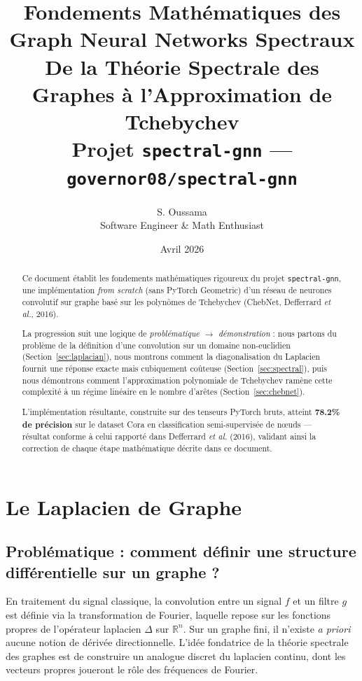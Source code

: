 \documentclass[12pt, a4paper]{article}
\title{%
  \vspace{-1cm}
  {\LARGE\bfseries Fondements Mathématiques des Graph Neural Networks Spectraux}\\[0.8em]
  {\large De la Théorie Spectrale des Graphes à l'Approximation de Tchebychev}\\[0.5em]
  {\normalsize Projet \texttt{spectral-gnn} --- \texttt{governor08/spectral-gnn}}
}
\author{S. Oussama \\ \small Software Engineer \& Math Enthusiast}
\date{Avril 2026}
\theoremstyle{definition}
\newcommand{\R}{\mathbb{R}}
\begin{document}

\maketitle
\thispagestyle{empty}

\begin{abstract}
Ce document établit les fondements mathématiques rigoureux du projet \texttt{spectral-gnn},
une implémentation \emph{from scratch} (sans PyTorch Geometric) d'un réseau de neurones
convolutif sur graphe basé sur les polynômes de Tchebychev (ChebNet,
Defferrard \emph{et al.}, 2016).

La progression suit une logique de \emph{problématique $\to$ démonstration} :
nous partons du problème de la définition d'une convolution sur un domaine non-euclidien
(Section~\ref{sec:laplacian}), nous montrons comment la diagonalisation du Laplacien
fournit une réponse exacte mais cubiquement coûteuse (Section~\ref{sec:spectral}),
puis nous démontrons comment l'approximation polynomiale de Tchebychev ramène
cette complexité à un régime linéaire en le nombre d'arêtes (Section~\ref{sec:chebnet}).

L'implémentation résultante, construite sur des tenseurs PyTorch bruts,
atteint \textbf{78.2\% de précision} sur le dataset Cora en classification
semi-supervisée de nœuds --- résultat conforme à celui rapporté dans
Defferrard \emph{et al.} (2016), validant ainsi la correction de chaque étape
mathématique décrite dans ce document.
\end{abstract}

\newpage
\tableofcontents
\newpage

\section{Le Laplacien de Graphe}
\label{sec:laplacian}

\subsection{Problématique : comment définir une structure différentielle sur un graphe ?}

En traitement du signal classique, la convolution entre un signal $f$ et un filtre $g$
est définie via la transformation de Fourier, laquelle repose sur les fonctions propres
de l'opérateur laplacien $\Delta$ sur $\R^n$.
Sur un graphe fini, il n'existe \emph{a priori} aucune notion de dérivée directionnelle.
L'idée fondatrice de la théorie spectrale des graphes est de construire un analogue discret
du laplacien continu, dont les vecteurs propres joueront le rôle des fréquences de Fourier.
\end{document}
